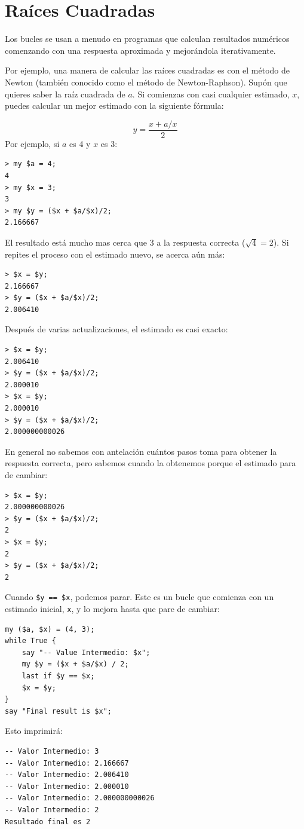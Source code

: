 \section{Raíces Cuadradas}
\label{squareroot}

Los bucles se usan a menudo en programas que calculan
resultados numéricos comenzando con una respuesta 
aproximada y mejorándola iterativamente.


Por ejemplo, una manera de calcular las raíces cuadradas
es con el método de Newton (también conocido como el método de
Newton-Raphson). Supón que quieres saber la raíz cuadrada de $a$. 
Si comienzas con casi cualquier estimado, $x$, puedes calcular un mejor
estimado con la siguiente fórmula:

\[ y = \frac{x + a/x}{2} \]
%
Por ejemplo, si $a$ es 4 y $x$ es 3:

\begin{verbatim}
> my $a = 4;
4
> my $x = 3;
3
> my $y = ($x + $a/$x)/2;
2.166667
\end{verbatim}
%
El resultado está mucho mas cerca que 3 a la respuesta correcta ($\sqrt{4} = 2$).
Si repites el proceso con el estimado nuevo, se acerca aún más:

\begin{verbatim}
> $x = $y;
2.166667
> $y = ($x + $a/$x)/2;
2.006410
\end{verbatim}
%
Después de varias actualizaciones, el estimado es casi exacto:

\begin{verbatim}
> $x = $y;
2.006410
> $y = ($x + $a/$x)/2;
2.000010
> $x = $y;
2.000010
> $y = ($x + $a/$x)/2;
2.000000000026
\end{verbatim}
%
En general no sabemos con antelación cuántos pasos toma
para obtener la respuesta correcta, pero sabemos cuando la 
obtenemos porque el estimado para de cambiar:

\begin{verbatim}
> $x = $y;
2.000000000026
> $y = ($x + $a/$x)/2;
2
> $x = $y;
2
> $y = ($x + $a/$x)/2;
2
\end{verbatim}
%
Cuando {\tt \$y == \$x}, podemos parar. Este es un bucle que comienza
con un estimado inicial, {\tt x}, y lo mejora hasta que pare de cambiar:

\begin{verbatim}
my ($a, $x) = (4, 3);
while True {
    say "-- Value Intermedio: $x";
    my $y = ($x + $a/$x) / 2;
    last if $y == $x;
    $x = $y;
}
say "Final result is $x";
\end{verbatim}
%
Esto imprimirá:
\begin{verbatim}
-- Valor Intermedio: 3
-- Valor Intermedio: 2.166667
-- Valor Intermedio: 2.006410
-- Valor Intermedio: 2.000010
-- Valor Intermedio: 2.000000000026
-- Valor Intermedio: 2
Resultado final es 2
\end{verbatim}
%

